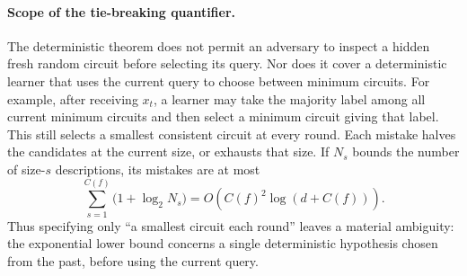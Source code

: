 \paragraph{Scope of the tie-breaking quantifier.}
The deterministic theorem does not permit an adversary to inspect
a hidden fresh random circuit before selecting its query. Nor does
it cover a deterministic learner that uses the current query to
choose between minimum circuits. For example, after receiving $x_t$,
a learner may take the majority label among all current minimum
circuits and then select a minimum circuit giving that label.
This still selects a smallest consistent circuit at every round.
Each mistake halves the candidates at the current size, or exhausts
that size. If $N_s$ bounds the number of size-$s$ descriptions, its
mistakes are at most
\[
  \sum_{s=1}^{C(f)}\bigl(1+\log_2 N_s\bigr)
  =O\!\left(C(f)^2\log(d+C(f))\right).
\]
Thus specifying only ``a smallest circuit each round'' leaves a
material ambiguity: the exponential lower bound concerns a single
deterministic hypothesis chosen from the past, before using the
current query.
